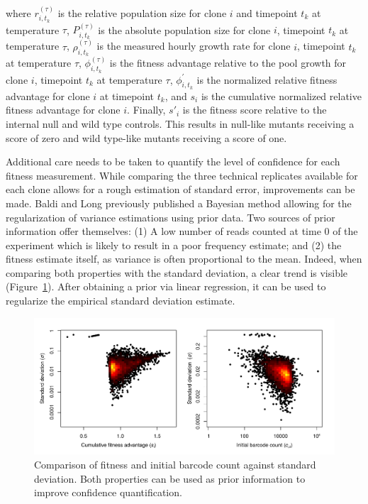 where $r_{i,t_k}^{(\tau)}$ is the relative population size for clone $i$ and timepoint $t_k$ at temperature $\tau$, $P_{i,t_k}^{(\tau)}$ is the absolute population size for clone $i$, timepoint $t_k$ at temperature $\tau$, $\rho_{i,t_k}^{(\tau)}$ is the measured hourly growth rate for clone $i$, timepoint $t_k$ at temperature $\tau$, $\phi_{i,t_k}^{(\tau)}$ is the fitness advantage relative to the pool growth for clone $i$, timepoint $t_k$ at temperature $\tau$, $\phi_{i,t_k}^\prime$ is the normalized relative fitness advantage for clone $i$ at timepoint $t_k$, and $s_i$ is the cumulative normalized relative fitness advantage for clone $i$. Finally, $s'_i$ is the fitness score relative to the internal null and wild type controls. This results in null-like mutants receiving a score of zero and wild type-like mutants receiving a score of one.

Additional care needs to be taken to quantify the level of confidence for each fitness measurement. While comparing the three technical replicates available for each clone allows for a rough estimation of standard error, improvements can be made. Baldi and Long previously published a Bayesian method allowing for the regularization of variance estimations using prior data\cite{baldiLong}. Two sources of prior information offer themselves: (1) A low number of reads counted at time 0 of the experiment which is likely to result in a poor frequency estimate; and (2) the fitness estimate itself, as variance is often proportional to the mean. Indeed, when comparing both properties with the standard deviation, a clear trend is visible (Figure~\ref{fig:baldiLong}). After obtaining a prior via linear regression, it can be used to regularize the empirical standard deviation estimate.

\begin{figure}[h!]
	\centering
	\includegraphics[width=\textwidth]{img/baldi_long.pdf}
	\caption{Comparison of fitness and initial barcode count against standard deviation. Both properties can be used as prior information to improve confidence quantification.}
	\label{fig:baldiLong}
\end{figure}


